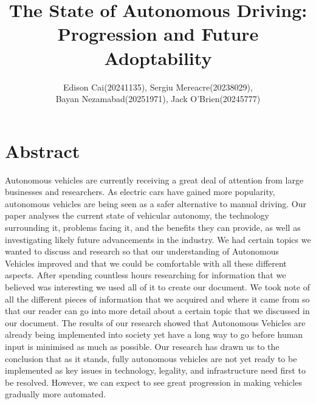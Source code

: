 \documentclass{article}
\author{Edison Cai(20241135), Sergiu Mereacre(20238029),\\
Bayan Nezamabad(20251971), Jack O'Brien(20245777)}
\title{The State of Autonomous Driving: Progression and Future Adoptability}
\begin{document}
\maketitle

\section{Abstract}
Autonomous vehicles are currently receiving a great deal of attention from large businesses and researchers. As electric cars have gained more popularity, autonomous vehicles are being seen as a safer alternative to manual driving. Our paper analyses the current state of vehicular autonomy, the technology surrounding it, problems facing it, and the benefits they can provide, as well as investigating likely future advancements in the industry.
\bigbreak
We had certain topics we wanted to discuss and research so that our understanding of Autonomous Vehicles improved and that we could be comfortable with all these different aspects. After spending countless hours researching for information that we believed was interesting we used all of it to create our document. We took note of all the different pieces of information that we acquired and where it came from so that our reader can go into more detail about a certain topic that we discussed in our document. 
\bigbreak
The results of our research showed that Autonomous Vehicles are already being implemented into society yet have a long way to go before human input is minimised as much as possible. Our research has drawn us to the conclusion that as it stands, fully autonomous vehicles are not yet ready to be implemented as key issues in technology, legality, and infrastructure need first to be resolved. However, we can expect to see great progression in making vehicles gradually more automated.
\end{document}

